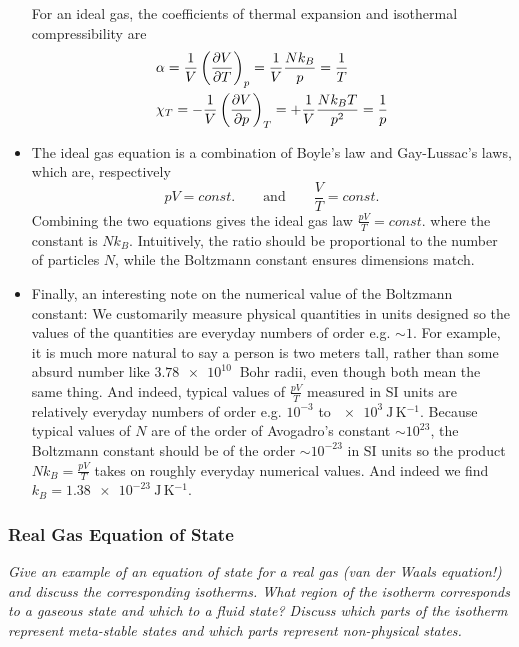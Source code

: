 \documentclass[11pt, a4paper]{article}
\newcommand{\eqtext}[1]{\qquad \text{#1} \qquad}
\newcommand{\pdveval}[3]{\left(\pdv{#1}{#2}\right)_{#3}}
\begin{document}
\begin{itemize}
	For an ideal gas, the coefficients of thermal expansion and isothermal compressibility are
	\begin{align*}
		&\alpha = \frac{1}{V} \pdveval{V}{T}{p} = \frac{1}{V} \frac{Nk_{B}}{p} = \frac{1}{T}\\
		&\chi_{T} =  - \frac{1}{V} \pdveval{V}{p}{T} = +\frac{1}{V} \frac{Nk_{B}T}{p^{2}} = \frac{1}{p}
	\end{align*}
	
	\item The ideal gas equation is a combination of Boyle's law and Gay-Lussac's laws, which are, respectively
	\begin{equation*}
		pV = const. \eqtext{and} \frac{V}{T} = const.
	\end{equation*}
	Combining the two equations gives the ideal gas law $ \frac{pV}{T} = const.$ where the constant is $ Nk_{B} $. Intuitively, the ratio should be proportional to the number of particles $ N $, while the Boltzmann constant ensures dimensions match. 
	
	\item Finally, an interesting note on the numerical value of the Boltzmann constant: We customarily measure physical quantities in units designed so the values of the quantities are everyday numbers of order e.g. $ \sim 1 $. For example, it is much more natural to say a person is two meters tall, rather than some absurd number like $ \SI{3.78e10}{} $ Bohr radii, even though both mean the same thing. And indeed, typical values of $ \frac{pV}{T} $ measured in SI units are relatively everyday numbers of order e.g. $ 10^{-3}$ to $ \SI{e3}{\joule \, \kelvin^{-1}}$. Because typical values of $ N $ are of the order of Avogadro's constant $ \sim 10^{23} $, the Boltzmann constant should be of the order $ \sim 10^{-23} $ in SI units so the product $ Nk_{B} = \frac{pV}{T} $ takes on roughly everyday numerical values. And indeed we find $  k_{B} = \SI{1.38e-23}{\joule \, \kelvin^{-1}}  $.
\end{itemize}


\subsubsection{Real Gas Equation of State}
\textit{Give an example of an equation of state for a real gas (van der Waals equation!) and discuss the corresponding isotherms. What region of the isotherm corresponds to a gaseous state and which to a fluid state? Discuss which parts of the isotherm represent meta-stable states and which parts represent non-physical states.}
\end{document}
